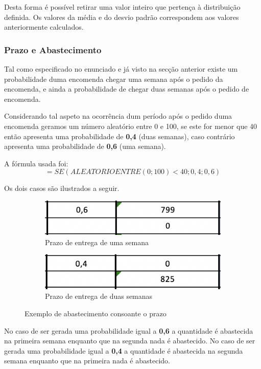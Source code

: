 \documentclass[a4paper]{article}
\begin{document}
Desta forma é possível retirar uma valor inteiro que pertença à distribuição definida. Os valores da média e do desvio padrão correspondem aos valores anteriormente calculados.


\subsubsection{Prazo e Abastecimento}

Tal como especificado no enunciado e já visto na secção anterior existe um probabilidade duma encomenda chegar uma semana após o pedido da encomenda, e ainda a probabilidade de chegar duas semanas após o pedido de encomenda.

Considerando tal aspeto na ocorrência dum período após o pedido duma encomenda geramos um número aleatório entre 0 e 100, se este for menor que 40 então apresenta uma probabilidade de \textbf{0,4} (duas semanas), caso contrário apresenta uma probabilidade de \textbf{0,6} (uma semana).

A fórmula usada foi:  $$ =SE(ALEATORIOENTRE(0;100) < 40 ; 0,4 ; 0,6) $$

Os dois casos são ilustrados a seguir.

\begin{figure}[H]
  \centering
  \begin{subfigure}[b]{0.4\linewidth}
    \includegraphics[scale = 0.6]{prazo_1sem.png}
    \caption{Prazo de entrega de uma semana}
  \end{subfigure}
  \begin{subfigure}[b]{0.5\linewidth}
    \includegraphics[scale=0.6]{prazo_2sem.png}
    \caption{Prazo de entrega de duas semanas}
  \end{subfigure}
  \caption{Exemplo de abastecimento consoante o prazo}
  \label{fig:praz}
\end{figure}

No caso de ser gerada uma probabilidade igual a \textbf{0,6} a quantidade é abastecida na primeira semana enquanto que na segunda nada é abastecido. No caso de ser gerada uma probabilidade igual a \textbf{0,4} a quantidade é abastecida na segunda semana enquanto que na primeira nada é abastecido.
\end{document}
